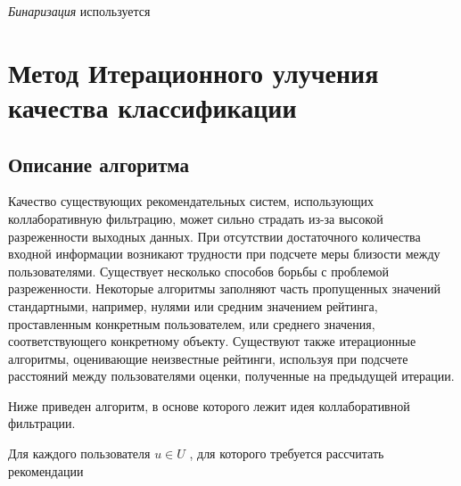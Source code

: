\documentclass[12pt]{article} %
\begin{document}
\par

\textit{Бинаризация} используется 



\section{Метод Итерационного улучения качества классификации}
\subsection{Описание алгоритма}
Качество существующих рекомендательных систем, использующих коллаборативную фильтрацию, может сильно страдать из-за высокой разреженности выходных данных. При отсутствии достаточного количества входной информации возникают трудности при подсчете меры близости между пользователями. Существует несколько способов борьбы с проблемой разреженности. Некоторые алгоритмы заполняют часть пропущенных значений стандартными, например, нулями или средним значением рейтинга, проставленным конкретным пользователем, или среднего значения, соответствующего конкретному объекту. Существуют также итерационные алгоритмы, оценивающие неизвестные рейтинги, используя при подсчете расстояний между пользователями оценки, полученные на предыдущей итерации. 
\par
Ниже приведен алгоритм, в основе которого лежит идея коллаборативной фильтрации. 

Для каждого пользователя $u \in U$ , для которого требуется рассчитать рекомендации
\end{document}
